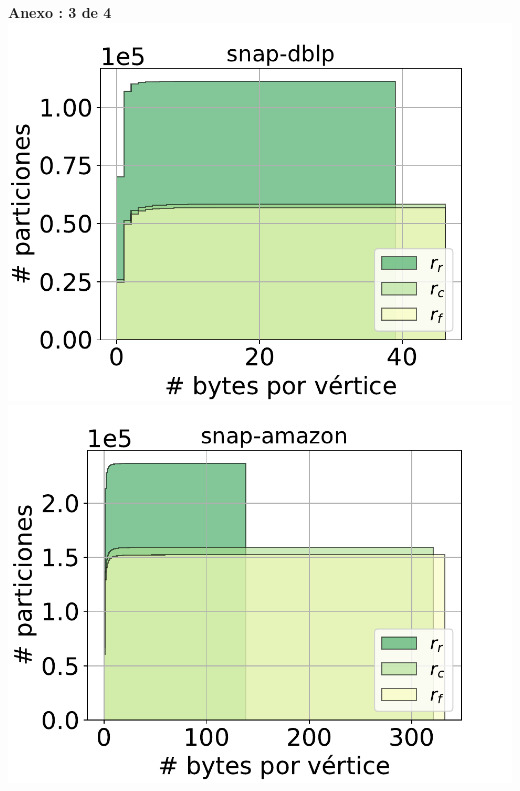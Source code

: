 \centering
\begin{minipage}{1\textwidth}
    \centering
    \textbf{Anexo \thechapter:  3 de 4}
    \includegraphics[width=.9\linewidth]{img/cdf/snap-dblp.pdf} \\
    \includegraphics[width=.9\linewidth]{img/cdf/snap-amazon.pdf} \\
\end{minipage}

